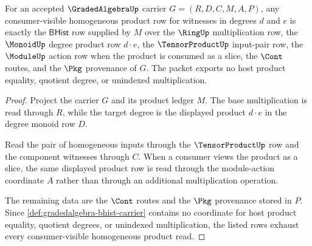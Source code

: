 \begin{theorem}
\label{thm:gradedalgebra-homogeneous-product-scope-exactness}
For an accepted $\GradedAlgebraUp$ carrier $G=(R,D,C,M,A,P)$, any consumer-visible homogeneous product row for witnesses in degrees $d$ and $e$ is exactly the $\mathsf{BHist}$ row supplied by $M$ over the $\RingUp$ multiplication row, the $\MonoidUp$ degree product row $d\cdot e$, the $\TensorProductUp$ input-pair row, the $\ModuleUp$ action row when the product is consumed as a slice, the $\Cont$ routes, and the $\Pkg$ provenance of $G$. The packet exports no host product equality, quotient degree, or unindexed multiplication.
\end{theorem}
\begin{proof}
Project the carrier $G$ and its product ledger $M$. The base multiplication is read through $R$, while the target degree is the displayed product $d\cdot e$ in the degree monoid row $D$.

Read the pair of homogeneous inputs through the $\TensorProductUp$ row and the component witnesses through $C$. When a consumer views the product as a slice, the same displayed product row is read through the module-action coordinate $A$ rather than through an additional multiplication operation.

The remaining data are the $\Cont$ routes and the $\Pkg$ provenance stored in $P$. Since \autoref{def:gradedalgebra-bhist-carrier} contains no coordinate for host product equality, quotient degrees, or unindexed multiplication, the listed rows exhaust every consumer-visible homogeneous product read.
\end{proof}

